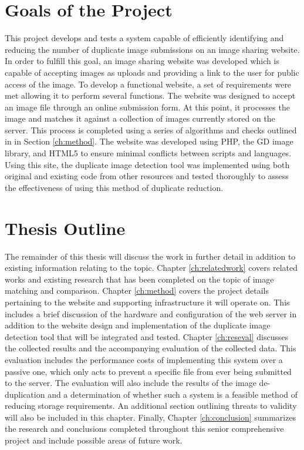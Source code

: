 \section{Goals of the Project}\label{sec:goals}
This project develops and tests a system capable of efficiently identifying and reducing the number of duplicate image submissions on an image sharing website. In order to fulfill this goal, an image sharing website was developed which is capable of accepting images as uploads and providing a link to the user for public access of the image. To develop a functional website, a set of requirements were met allowing it to perform several functions. The website was designed to accept an image file through an online submission form. At this point, it processes the image and matches it against a collection of images currently stored on the server. This process is completed using a series of algorithms and checks outlined in in Section \ref{ch:method}. The website was developed using PHP, the GD image library, and HTML5 to ensure minimal conflicts between scripts and languages. Using this site, the duplicate image detection tool was implemented using both original and existing code from other resources and tested thoroughly to assess the effectiveness of using this method of duplicate reduction.

\section{Thesis Outline}\label{sec:outline}
The remainder of this thesis will discuss the work in further detail in addition to existing information relating to the topic. Chapter \ref{ch:relatedwork} covers related works and existing research that has been completed on the topic of image matching and comparison. Chapter \ref{ch:method} covers the project details pertaining to the website and supporting infrastructure it will operate on. This includes a brief discussion of the hardware and configuration of the web server in addition to the website design and implementation of the duplicate image detection tool that will be integrated and tested. Chapter \ref{ch:reseval} discusses the collected results and the accompanying evaluation of the collected data. This evaluation includes the performance costs of implementing this system over a passive one, which only acts to prevent a specific file from ever being submitted to the server. The evaluation will also include the results of the image de-duplication and a determination of whether such a system is a feasible method of reducing storage requirements. An additional section outlining threats to validity will also be included in this chapter. Finally, Chapter \ref{ch:conclusion} summarizes the research and conclusions completed throughout this senior comprehensive project and include possible areas of future work.
